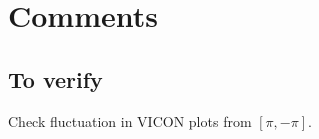 \documentclass[12pt]{article}
\begin{document}
\section*{Comments}

\subsection*{To verify}

Check fluctuation in VICON plots from $[\pi, -\pi]$.
\end{document}
